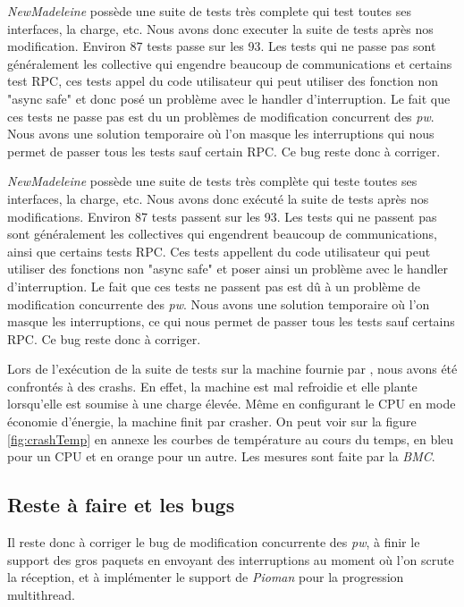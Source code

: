 \emph{NewMadeleine} possède une suite de tests très complete qui test toutes ses interfaces, la charge, etc.
Nous avons donc executer la suite de tests après nos modification. Environ 87 tests passe sur les 93.
Les tests qui ne passe pas sont généralement les collective qui engendre beaucoup de communications et certains test RPC,
ces tests appel du code utilisateur qui peut utiliser des fonction non "async safe" et donc posé un problème avec le handler d'interruption.
Le fait que ces tests ne passe pas est du un problèmes de modification concurrent des \emph{pw}.
Nous avons une solution temporaire où l'on masque les interruptions qui nous permet de passer tous les tests sauf certain RPC.
Ce bug reste donc à corriger.

\emph{NewMadeleine} possède une suite de tests très complète qui teste toutes ses interfaces, la charge, etc.
Nous avons donc exécuté la suite de tests après nos modifications. Environ 87 tests passent sur les 93.
Les tests qui ne passent pas sont généralement les collectives qui engendrent beaucoup de communications, ainsi que certains tests RPC.
Ces tests appellent du code utilisateur qui peut utiliser des fonctions non "async safe" et poser ainsi un problème avec le handler d'interruption.
Le fait que ces tests ne passent pas est dû à un problème de modification concurrente des \emph{pw}.
Nous avons une solution temporaire où l'on masque les interruptions, ce qui nous permet de passer tous les tests sauf certains RPC.
Ce bug reste donc à corriger.

Lors de l'exécution de la suite de tests sur la machine fournie par \atos{}, nous avons été confrontés à des crashs.
En effet, la machine est mal refroidie et elle plante lorsqu'elle est soumise à une charge élevée.
Même en configurant le CPU en mode économie d'énergie, la machine finit par crasher.
On peut voir sur la figure \ref{fig:crashTemp} en annexe les courbes de température au cours du temps,
en bleu pour un CPU et en orange pour un autre.
Les mesures sont faite par la \emph{BMC}. %

\subsection{Reste à faire et les bugs}

Il reste donc à corriger le bug de modification concurrente des \emph{pw},
à finir le support des gros paquets en envoyant des interruptions au moment où l'on scrute la réception,
et à implémenter le support de \emph{Pioman} pour la progression multithread.

